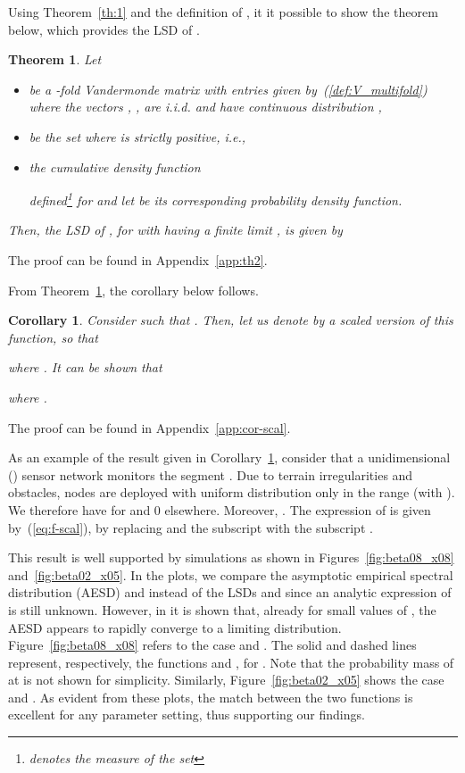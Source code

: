 \documentclass[11pt, draftcls, onecolumn, a4paper]{IEEEtran}
\newtheorem{theorem}{Theorem}[section]
\newtheorem{corollary}{Corollary}[section]
\begin{document}
Using Theorem~\ref{th:1} and the definition of , it it possible
to show the theorem below, which provides the LSD of .
\begin{theorem}
\label{th:2}
Let
\begin{itemize}
\item  be a -fold  Vandermonde matrix with
  entries given by~(\ref{def:V_multifold}) where the vectors ,
  , are i.i.d. and have continuous distribution
  , 
\item  be the set where  is strictly positive,
  i.e.,  
\item the cumulative density function

defined\footnote{ denotes the measure of the set } for  and
let  be its corresponding probability density function.
\end{itemize}
Then, the LSD of , for  with
 having a finite limit , is given by

\end{theorem}
\begin{IEEEproof}
The proof can be found in Appendix~\ref{app:th2}.
\end{IEEEproof}

From Theorem~\ref{th:2}, the corollary below follows.
\begin{corollary}
\label{cor-scal}
Consider  such that   .
Then, let us denote
by  a scaled version of this function, so that 

where .  It can be shown that
 
where .
\end{corollary}
\begin{IEEEproof}
The proof can be found in Appendix~\ref{app:cor-scal}.
\end{IEEEproof}

As an example of the result given in Corollary~\ref{cor-scal}, consider
that a unidimensional () sensor network monitors the segment
. Due to terrain irregularities and obstacles, nodes
are deployed with uniform distribution only in the range 
(with ).  We therefore have  for
   and 0 elsewhere.  Moreover,
  . The
  expression of  is given
  by~(\ref{eq:f-scal}), by replacing  and the
  subscript  with the subscript . 

This result is well
  supported by simulations as shown in Figures~\ref{fig:beta08_x08}
  and~\ref{fig:beta02_x05}.
In the plots, we compare the asymptotic empirical spectral distribution 
(AESD)  and
 instead of the LSDs  and
 since an analytic expression of  is
still unknown.  However, in \cite{TSP1,TSP2,TSP3} it is shown
that, already for small values of , the AESD 
 appears to rapidly
converge to a limiting distribution.
Figure~\ref{fig:beta08_x08} refers to the case 
and . The solid and dashed lines represent, respectively, the
functions  and
, for .  Note that
the probability mass of  at  is not
shown for simplicity. Similarly, Figure~\ref{fig:beta02_x05} shows
the case  and . As evident from these plots,
the match between the two functions is excellent for any parameter
setting, thus supporting our findings.
\end{document}
